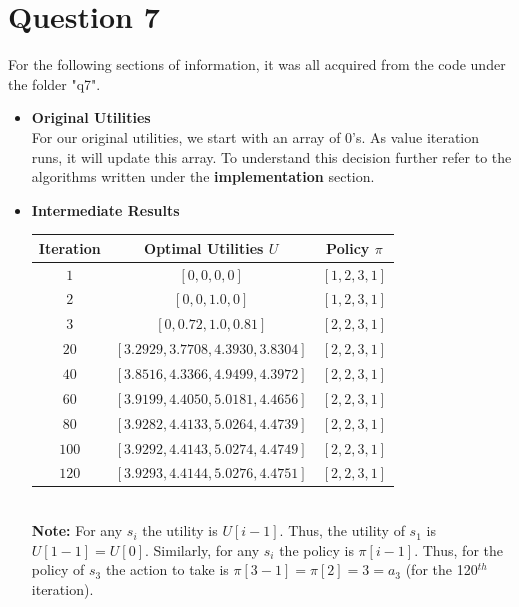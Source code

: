 \documentclass{article}
\begin{document}
\newpage
\section*{Question 7}
For the following sections of information, it was all acquired from the code under the folder "q7".
    \begin{itemize}
        \item \textbf{Original Utilities}\\
            For our original utilities, we start with an array of 0's. As value iteration runs, 
            it will update this array. To understand this decision further refer to the algorithms
            written under the \textbf{implementation} section.
        \item \textbf{Intermediate Results}\\
            \begin{center}
            \begin{tabular}{|c|c|c|}
                \hline
                Iteration & Optimal Utilities $U$ & Policy $\pi$ \\
                \hline
                $1$ & $[0, 0, 0, 0]$ & $[1, 2, 3, 1]$\\
                $2$ & $[0, 0, 1.0, 0]$ & $ [1, 2, 3, 1]$\\
                $3$ & $[0, 0.72, 1.0, 0.81]$ & $[2, 2, 3, 1]$\\
                $20$ & $[3.2929, 3.7708, 4.3930, 3.8304]$ & $[2, 2, 3, 1]$\\
                $40$ & $[3.8516, 4.3366, 4.9499, 4.3972]$ & $[2, 2, 3, 1]$\\
                $60$ & $[3.9199, 4.4050, 5.0181, 4.4656]$ & $[2, 2, 3, 1]$\\
                $80$ & $[3.9282, 4.4133, 5.0264, 4.4739]$ & $[2, 2, 3, 1]$\\
                $100$ & $[3.9292, 4.4143, 5.0274, 4.4749]$ & $[2, 2, 3, 1]$\\
                $120$ & $[3.9293, 4.4144, 5.0276, 4.4751]$ & $[2, 2, 3, 1]$\\
                \hline
            \end{tabular}\\
            \textbf{Note:} For any $s_i$ the utility is $U[i - 1]$. Thus,
                the utility of $s_1$ is $U[1 - 1] = U[0]$. Similarly, for any $s_i$ the 
                policy is $\pi[i - 1]$. Thus, for the policy of $s_3$ the action to take is
                $\pi[3 - 1] = \pi[2] = 3 = a_3$ (for the 120$^{th}$ iteration).
            

\end{center}
\end{itemize}
\end{document}
